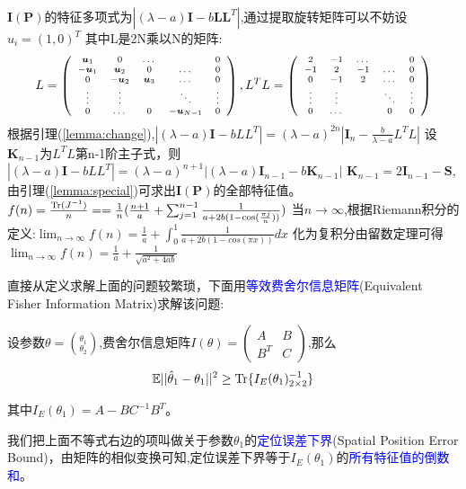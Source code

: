 $\bm{I}(\bm{P})$的特征多项式为$|(\lambda-a)\bm{I}-b\bm{L}\bm{L}^T|$,通过提取旋转矩阵可以不妨设$u_i=(1,0)^T$
其中L是2N乘以N的矩阵:
\[\scriptsize{
L=\left(
\begin{array}{ccccc}
\bm{u}_1&0&\dots&&0\\
-\bm{u}_1&\bm{u}_2&0&\dots&0\\
0&-\bm{u}_2&\bm{u}_3&\dots&0\\
\vdots &\vdots&&\ddots &\vdots\\
0&\dots&0&-\bm{u}_{N-1}&0\\
\end{array}
\right),L^TL=\left(
\begin{array}{ccccc}
2&-1&\dots&&0\\
-1&2&-1&\dots&0\\
0&-1&2&\dots&0\\
\vdots &\vdots&&\ddots &\vdots\\
0&\dots&&0&0\\
\end{array}
\right)}
\]
根据引理(\ref{lemma:change}),$|(\lambda-a)\bm{I}-bLL^T|=(\lambda-a)^{2n}|\bm{I}_n-\frac{b}{\lambda-a}L^TL|$
设$\bm{K}_{n-1}$为$L^TL$第n-1阶主子式，则
$|(\lambda-a)\bm{I}-bLL^T|=(\lambda-a)^{n+1}|(\lambda-a)\bm{I}_{n-1}-b\bm{K}_{n-1}|$
$\bm{K}_{n-1}=2\bm{I}_{n-1}-\bm{S}$,由引理(\ref{lemma:special})可求出$\bm{I}(\bm{P})$的全部特征值。
$f(n)=\frac{\operatorname{Tr}(J^{-1})}{n}==\frac{1}{n}(\frac{n+1}{a}+\sum_{j=1}^{n-1}\frac{1}{a+2b(1-\cos(\frac{\pi j}{n}))})$
当$n\to \infty$,根据Riemann积分的定义:$\lim_{n\rightarrow \infty}f(n)=\frac{1}{a}+\int_0^1 \frac{1}{a+2b(1-cos(\pi x))}dx$
化为复积分由留数定理可得$\lim_{n\rightarrow \infty}f(n)=\frac{1}{a}+\frac{1}{\sqrt{a^2+4ab}}$



    直接从定义求解上面的问题较繁琐，下面用\textcolor{blue}{等效费舍尔信息矩阵}(Equivalent Fisher Information Matrix)求解该问题:

\begin{theorem}
    设参数$\theta=\binom{\theta_1}{\theta_2}$,费舍尔信息矩阵$I(\theta)=\left(\begin{array}{cc}A&B\\B^T&C\end{array}\right)$,那么\[
    \mathbb{E}{||\hat{\theta}_1-\theta_1||^2}\geq \operatorname{Tr}\{I_E(\theta_1)^{-1}_{2\times 2}\}\]

    其中$I_E(\theta_1)=A-BC^{-1}B^T$。
\end{theorem}
	我们把上面不等式右边的项叫做关于参数$\theta_1$的\textcolor{blue}{定位误差下界}(Spatial Position Error Bound)，由矩阵的相似变换可知,定位误差下界等于$I_E(\theta_1)$的\textcolor{blue}{所有特征值的倒数和}。

